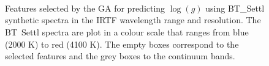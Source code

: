 \begin{figure}
 \captionsetup[subfloat]{farskip=2pt,captionskip=-18pt}
 \vspace*{-10pt}
 \\[-9ex]

 \\[-9ex]

 \\[-7ex]

 \caption{Features selected by the GA for predicting $\log(g)$ using
    BT\_Settl synthetic spectra in the IRTF wavelength range
    and resolution. The BT\ Settl spectra are plot in a colour scale
    that ranges from blue (2000 K) to red (4100 K). The empty boxes
    correspond to the selected features and the grey boxes to the
    continuum bands.}
 \label{fig:IRTF-logg} 
\end {figure}

